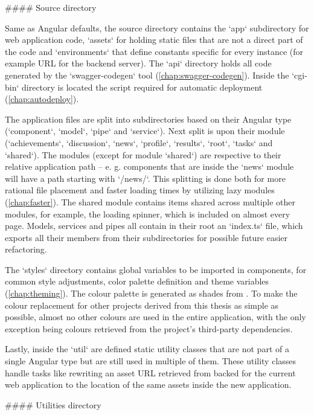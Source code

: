 \documentclass[
  digital, %
  oneside, %
  lof,     %
  nolot,     %
]{fithesis4}
\begin{document}
{#### Source directory

Same as Angular defaults, the source directory contains the `app` subdirectory for web application code, `assets` for holding static files that are not a direct part of the code and `environments` that define constants specific for every instance (for example URL for the backend server). The `api` directory holds all code generated by the `swagger-codegen` tool (\autoref{chap:swagger-codegen}). Inside the `cgi-bin` directory is located the script required for automatic deployment (\autoref{chap:autodeploy}).

The application files are split into subdirectories based on their Angular type (`component`, `model`, `pipe` and `service`). Next split is upon their module (`achievements`, `discussion`, `news`, `profile`, `results`, `root`, `tasks` and `shared`). The modules (except for module `shared`) are respective to their relative application path -- e. g. components that are inside the `news` module will have a path starting with `/news/`. This splitting is done both for more rational file placement and faster loading times by utilizing lazy modules (\autoref{chap:faster}). The shared module contains items shared across multiple other modules, for example, the loading spinner, which is included on almost every page. Models, services and pipes all contain in their root an `index.ts` file, which exports all their members from their subdirectories for possible future easier refactoring.

The `styles` directory contains global variables to be imported in components,  for common style adjustments, color palette definition and theme variables (\autoref{chap:theming}). The colour palette is generated as shades from . To make the colour replacement for other projects derived from this thesis as simple as possible, almost no other colours are used in the entire application, with the only exception being colours retrieved from the project's third-party dependencies.

Lastly, inside the `util` are defined static utility classes that are not part of a single Angular type but are still used in multiple of them. These utility classes handle tasks like rewriting an asset URL retrieved from backed for the current web application to the location of the same assets inside the new application.

#### Utilities directory
\label{chap:utils}

}
\end{document}
